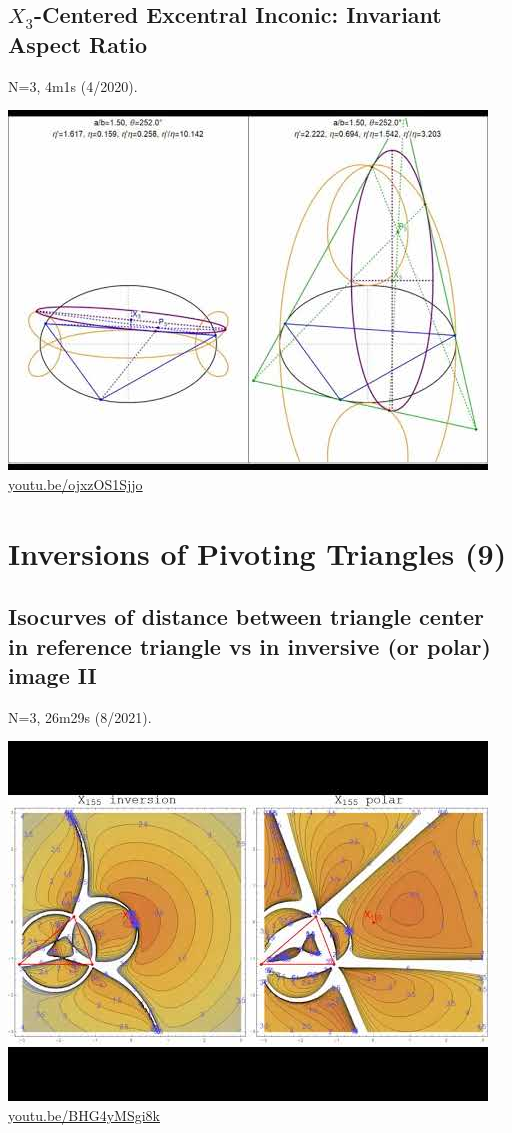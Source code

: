\documentclass[12pt]{amsart}
\begin{document}
\subsection{$X_{3}$-Centered Excentral Inconic: Invariant Aspect Ratio}
\label{vid:ojxzOS1Sjjo}
\noindent N=3, 4m1s (4/2020). 
\begin{center}\includegraphics[width=.5\textwidth]{pics/ojxzOS1Sjjo.jpg} \\ 
\href{https://youtu.be/ojxzOS1Sjjo}{\url{youtu.be/ojxzOS1Sjjo}}\end{center}
% 


\section{Inversions of Pivoting Triangles (9)}

\subsection{Isocurves of distance between triangle center in reference triangle vs in inversive (or polar) image II}
\label{vid:BHG4yMSgi8k}
\noindent N=3, 26m29s (8/2021). 
\begin{center}\includegraphics[width=.5\textwidth]{pics/BHG4yMSgi8k.jpg} \\ 
\href{https://youtu.be/BHG4yMSgi8k}{\url{youtu.be/BHG4yMSgi8k}}\end{center}
% 
\end{document}
